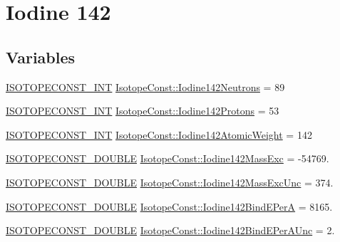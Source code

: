 \hypertarget{group___isotope_const-_iodine-_i142}{}\section{Iodine 142}
\label{group___isotope_const-_iodine-_i142}
\subsection*{Variables}
\begin{DoxyCompactItemize}
\item 
\mbox{\hyperlink{group___isotope_const-_macros_ga5f18360b3e99483a35c32d789e62621c}{I\+S\+O\+T\+O\+P\+E\+C\+O\+N\+S\+T\+\_\+\+I\+NT}} \mbox{\hyperlink{group___isotope_const-_iodine-_i142_ga80fcb033e325bedc4f9d823df92c027b}{Isotope\+Const\+::\+Iodine142\+Neutrons}} = 89
\item 
\mbox{\hyperlink{group___isotope_const-_macros_ga5f18360b3e99483a35c32d789e62621c}{I\+S\+O\+T\+O\+P\+E\+C\+O\+N\+S\+T\+\_\+\+I\+NT}} \mbox{\hyperlink{group___isotope_const-_iodine-_i142_ga5d5eb7fff010d4996de26fa1f331dbf7}{Isotope\+Const\+::\+Iodine142\+Protons}} = 53
\item 
\mbox{\hyperlink{group___isotope_const-_macros_ga5f18360b3e99483a35c32d789e62621c}{I\+S\+O\+T\+O\+P\+E\+C\+O\+N\+S\+T\+\_\+\+I\+NT}} \mbox{\hyperlink{group___isotope_const-_iodine-_i142_gaa60c1c5d40c972c8b5dc68851c13af25}{Isotope\+Const\+::\+Iodine142\+Atomic\+Weight}} = 142
\item 
\mbox{\hyperlink{group___isotope_const-_macros_ga8f45a7272ce02c0b4c65c44636ed719a}{I\+S\+O\+T\+O\+P\+E\+C\+O\+N\+S\+T\+\_\+\+D\+O\+U\+B\+LE}} \mbox{\hyperlink{group___isotope_const-_iodine-_i142_ga75084cd78d1cc5f3f79f47965ca19dc7}{Isotope\+Const\+::\+Iodine142\+Mass\+Exc}} = -\/54769.
\item 
\mbox{\hyperlink{group___isotope_const-_macros_ga8f45a7272ce02c0b4c65c44636ed719a}{I\+S\+O\+T\+O\+P\+E\+C\+O\+N\+S\+T\+\_\+\+D\+O\+U\+B\+LE}} \mbox{\hyperlink{group___isotope_const-_iodine-_i142_gabeb203135f0eb843a6396d08518ad5ce}{Isotope\+Const\+::\+Iodine142\+Mass\+Exc\+Unc}} = 374.
\item 
\mbox{\hyperlink{group___isotope_const-_macros_ga8f45a7272ce02c0b4c65c44636ed719a}{I\+S\+O\+T\+O\+P\+E\+C\+O\+N\+S\+T\+\_\+\+D\+O\+U\+B\+LE}} \mbox{\hyperlink{group___isotope_const-_iodine-_i142_ga91fef62084493c6d1e2209116604b5f2}{Isotope\+Const\+::\+Iodine142\+Bind\+E\+PerA}} = 8165.
\item 
\mbox{\hyperlink{group___isotope_const-_macros_ga8f45a7272ce02c0b4c65c44636ed719a}{I\+S\+O\+T\+O\+P\+E\+C\+O\+N\+S\+T\+\_\+\+D\+O\+U\+B\+LE}} \mbox{\hyperlink{group___isotope_const-_iodine-_i142_gaf5b51ea7bb46eaacd254627f42d371cd}{Isotope\+Const\+::\+Iodine142\+Bind\+E\+Per\+A\+Unc}} = 2.

\end{DoxyCompactItemize}

